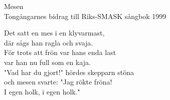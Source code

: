  {\Large Mesen}\\{\tiny  Tongångarnes bidrag till Riks-SMASK sångbok 1999}
  \begin{vers}
Det satt en mes i en klyvarmast, \\
där sågs han ragla och svaja. \\
För trots att frön var hans enda last \\
var han nu full som en kaja. \\
"Vad har du gjort!" hördes skepparn stöna \\
och mesen svarte: "Jag rökte fröna! \\
I egen holk, i egen holk." \\
\end{vers}